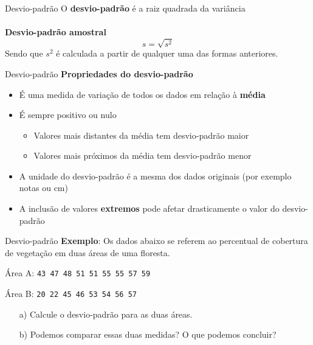 \documentclass[10pt]{beamer}\usepackage[]{graphicx}\usepackage[]{color}
\theoremstyle{definition}
\begin{document}
\begin{frame}{Desvio-padrão}
  O \textbf{desvio-padrão} é a raiz quadrada da variância\\~\\
  \textbf{Desvio-padrão amostral}
  \begin{equation*}
    s = \sqrt{s^2}
  \end{equation*}
  Sendo que $s^2$ é calculada a partir de qualquer uma das formas
  anteriores.
\end{frame}

\begin{frame}{Desvio-padrão}
  \textbf{Propriedades do desvio-padrão} \vspace{1em}
  \begin{itemize}
  \item É uma medida de variação de todos os dados em relação à
    \textbf{média}
  \item É sempre positivo ou nulo
    \begin{itemize}
    \item Valores mais distantes da média tem desvio-padrão maior
    \item Valores mais próximos da média tem desvio-padrão menor
    \end{itemize}
  \item A unidade do desvio-padrão é a mesma dos dados originais (por
    exemplo notas ou cm)
  \item A inclusão de valores \textbf{extremos} pode afetar
    drasticamente o valor do desvio-padrão
  \end{itemize}
\end{frame}




\begin{frame}{Desvio-padrão}
  \textbf{Exemplo}: Os dados abaixo se referem ao percentual de
  cobertura de vegetação em duas áreas de uma floresta.
  \begin{flushleft}
    Área A: \texttt{43 47 48 51 51 55 55 57 59}
  \end{flushleft}
  \begin{flushleft}
    Área B: \texttt{20 22 45 46 53 54 56 57}
  \end{flushleft}
  \begin{itemize}
  \item[a)] Calcule o desvio-padrão para as duas áreas.
  \item[b)] Podemos comparar essas duas medidas? O que podemos concluir?
  \end{itemize}
\end{frame}
\end{document}
